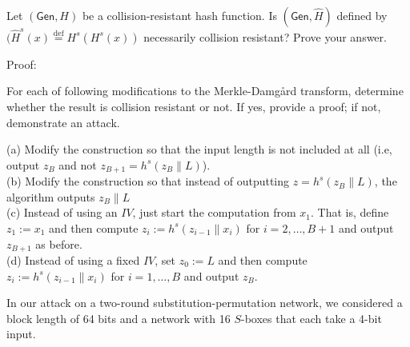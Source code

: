 \documentclass[12pt,letterpaper,boxed]{amspset}
\begin{document}
\begin{problem}[4.4]
Let $(\mathsf{Gen},H)$ be a collision-resistant hash function. Is $(\mathsf{Gen},\hat{H})$ defined by $(\hat{H}^s(x) \overset{\text{def}}{=} H^s(H^s(x))$ necessarily collision resistant? Prove your answer. 
\end{problem}

\begin{solution}
Proof:\\

\vspace{3cm}
\end{solution}

\begin{problem}[4.5]
For each of following modifications to the Merkle-Damg\r{a}rd transform, determine whether the result is collision resistant or not. If yes, provide a proof; if not, demonstrate an attack.
\end{problem}

\begin{solution}
(a) Modify the construction so that the input length is not included at all (i.e, output $z_B$ and not $z_{B+1} = h^s(z_B\| L)$).\\

\vspace{4cm}
\noindent (b) Modify the construction so that instead of outputting $z = h^s(z_B\| L)$, the algorithm outputs $z_B\|L$\\

\vspace{4cm}
\noindent (c) Instead of using an $IV$, just start the computation from $x_1$. That is, define $z_1 := x_1$ and then compute $z_i := h^s(z_{i-1}\|x_i)$ for $i=2,\dotsc,B+1$ and output $z_{B+1}$ as before.\\

\vspace{4cm}
\noindent (d) Instead of using a fixed $IV$, set $z_0 := L$ and then compute $z_i := h^s(z_{i-1}\|x_i)$ for $i=1,\dotsc,B$ and output $z_B$.\\

\vspace{4cm}
\end{solution}

\begin{problem}[5.1]
In our attack on a two-round substitution-permutation network, we considered a block length of 64 bits and a network with 16 $S$-boxes that each take a 4-bit input. 
\end{problem}
\end{document}
